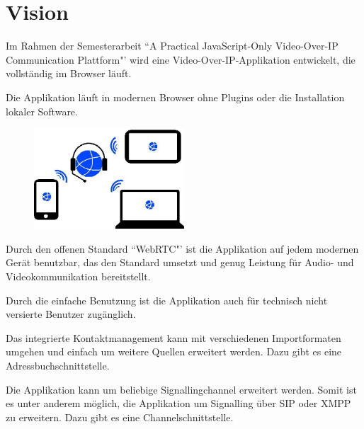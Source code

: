 \chapter{Vision}
	Im Rahmen der Semesterarbeit ``A Practical JavaScript-Only Video-Over-IP Communication Plattform"' wird eine
	Video-Over-IP-Applikation entwickelt, die vollständig im Browser läuft.
	
	Die Applikation läuft in modernen Browser ohne Plugins oder die Installation lokaler Software.
			
	\begin{figure}[H]
		\centering
		\includegraphics[width=0.5\textwidth]{img/plattformUnabhaengigkeit.jpg}
		\label{plattformUnabhaengigkeit}
	\end{figure}
	
	Durch den offenen Standard ``WebRTC"' ist die Applikation auf jedem modernen Gerät benutzbar, das den Standard umsetzt und genug Leistung für Audio- und Videokommunikation bereitstellt.
	
	Durch die einfache Benutzung ist die Applikation auch für technisch nicht
	versierte Benutzer zugänglich.
	
	Das integrierte Kontaktmanagement kann mit verschiedenen Importformaten umgehen und einfach um weitere Quellen erweitert werden. Dazu gibt es eine Adressbuchschnittstelle.
	
	Die Applikation kann um beliebige Signallingchannel erweitert werden. Somit ist
	es unter anderem möglich, die Applikation um Signalling über SIP oder XMPP zu
	erweitern. Dazu gibt es eine Channelschnittstelle.
	
	
